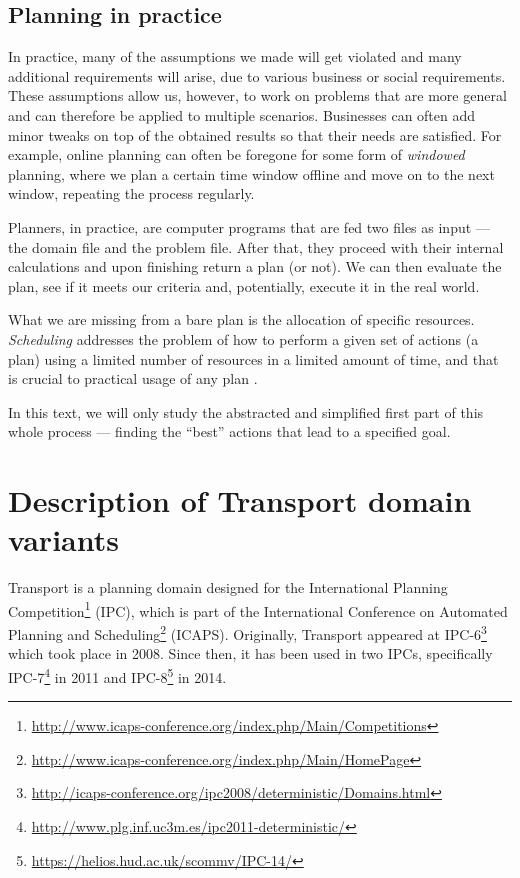 \subsection{Planning in practice}

In practice, many of the assumptions we made will get violated and many additional requirements will arise,
due to various business or social requirements.
These assumptions allow us, however, to work
on problems that are more general and can therefore be applied to multiple scenarios.
Businesses can often add minor tweaks on top of the obtained results so that
their needs are satisfied. 
For example, online planning can often be foregone for some form of \textit{windowed} planning,
where we plan a certain time window offline and move on to the next window,
repeating the process regularly.

Planners, in practice, are computer programs that are fed two files as input
--- the domain file and the problem file. After that, they proceed with their internal calculations
and upon finishing return a plan (or not). 
We can then evaluate the plan, see if it meets our criteria and, potentially,
execute it in the real world.

What we are missing from a bare plan is the allocation of specific resources.
\textit{Scheduling} addresses the problem of how to perform a given set of actions (a plan)
using a limited number of resources in a limited amount of time, and
that is crucial to practical usage of any plan \citep[Chapter~15]{Ghallab2004}.

In this text, we will only study the abstracted and simplified first part of this whole process
--- finding the ``best'' actions that lead to a specified goal.
















\section{Description of Transport domain variants}

Transport is a planning domain designed for
the International Planning
Competition\footnote{\url{http://www.icaps-conference.org/index.php/Main/Competitions}}
(IPC), which is part of the International Conference on Automated Planning and
Scheduling\footnote{\url{http://www.icaps-conference.org/index.php/Main/HomePage}} (ICAPS).
Originally, Transport appeared at 
IPC-6\footnote{\url{http://icaps-conference.org/ipc2008/deterministic/Domains.html}} which took place in 2008.
Since then, it has been used in two IPCs,
specifically IPC-7\footnote{\url{http://www.plg.inf.uc3m.es/ipc2011-deterministic/}} in 2011
and IPC-8\footnote{\url{https://helios.hud.ac.uk/scommv/IPC-14/}} in 2014.

